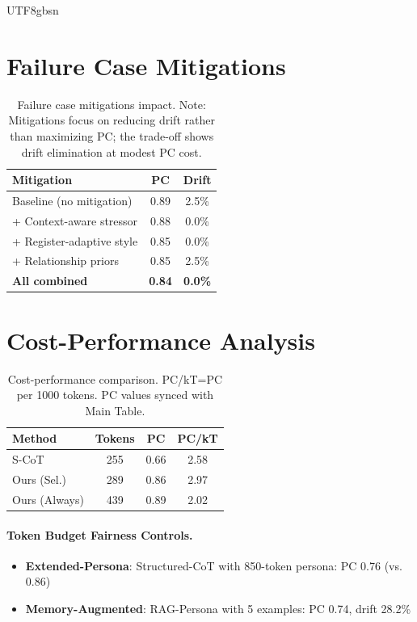 \documentclass[11pt]{article}
\begin{document}
\begin{CJK*}{UTF8}{gbsn}
\section{Failure Case Mitigations}
\label{sec:mitigation}

\begin{table}[h]
\centering
\small
\begin{tabular}{lcc}
\toprule
\textbf{Mitigation} & \textbf{PC} & \textbf{Drift} \\
\midrule
Baseline (no mitigation) & 0.89 & 2.5\% \\
+ Context-aware stressor & 0.88 & 0.0\% \\
+ Register-adaptive style & 0.85 & 0.0\% \\
+ Relationship priors & 0.85 & 2.5\% \\
\textbf{All combined} & \textbf{0.84} & \textbf{0.0\%} \\
\bottomrule
\end{tabular}
\caption{Failure case mitigations impact. Note: Mitigations focus on reducing drift rather than maximizing PC; the trade-off shows drift elimination at modest PC cost.}
\label{tab:mitigations}
\end{table}

\section{Cost-Performance Analysis}
\label{sec:cost_analysis}

\begin{table}[h]
\centering
\small
\begin{tabular}{lccc}
\toprule
\textbf{Method} & \textbf{Tokens} & \textbf{PC} & \textbf{PC/kT} \\
\midrule
S-CoT & 255 & 0.66 & 2.58 \\
Ours (Sel.) & 289 & 0.86 & 2.97 \\
Ours (Always) & 439 & 0.89 & 2.02 \\
\bottomrule
\end{tabular}
\caption{Cost-performance comparison. PC/kT=PC per 1000 tokens. PC values synced with Main Table.}
\label{tab:cost}
\end{table}

\paragraph{Token Budget Fairness Controls.}
\begin{itemize}
    \item \textbf{Extended-Persona}: Structured-CoT with 850-token persona: PC 0.76 (vs. 0.86)
    \item \textbf{Memory-Augmented}: RAG-Persona with 5 examples: PC 0.74, drift 28.2\%
\end{itemize}


\end{CJK*}
\end{document}
